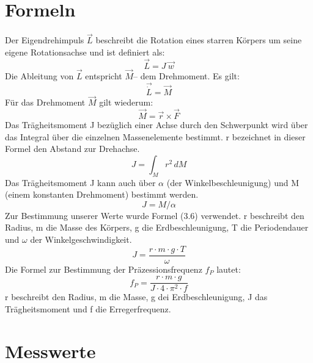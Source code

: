 \documentclass[12pt,a4paper,]{scrreprt}
\begin{document}
	\chapter{Formeln}
 Der Eigendrehimpuls $\vec L$  beschreibt die Rotation eines starren Körpers um seine eigene Rotationsachse und ist definiert als:\\
    \begin{equation}
\vec L = J~\vec w
\end{equation}
Die Ableitung von $\vec L$ entspricht $ \vec M $– dem Drehmoment. Es gilt:\\
\begin{equation}
\vec{\dot{L}} = \vec{M}
\end{equation}
Für das Drehmoment $\vec M$ gilt wiederum:
\begin{equation}
\vec M = \vec r \times \vec F
\end{equation}
Das Trägheitsmoment J bezüglich einer Achse durch den Schwerpunkt wird über das Integral über die einzelnen Massenelemente bestimmt. r bezeichnet in dieser Formel den Abstand zur Drehachse.\\
\begin{equation}
J=\int_M r^2 \,dM
\end{equation}
Das Trägheitsmoment J kann auch über $\alpha$ (der Winkelbeschleunigung) und M (einem konstanten Drehmoment) bestimmt werden.\\
\begin{equation}
J=M/\alpha
\end{equation}
Zur Bestimmung unserer Werte wurde Formel (3.6) verwendet. r beschreibt den Radius, m die Masse des Körpers, g die Erdbeschleunigung, T die Periodendauer und $\omega$ der Winkelgeschwindigkeit. 
\begin{equation}
	J  = \frac{r\cdot m \cdot g \cdot T}{\omega}
\end{equation}
Die Formel zur Bestimmung der Präzessionsfrequenz $f_P$ lautet:
\begin{equation}
	f_P = \frac{r\cdot m \cdot g}{J \cdot 4 \cdot \pi ^2 \cdot f}
\end{equation}
r beschreibt den Radius, m die Masse, g dei Erdbeschleunigung, J das Trägheitsmoment und f die Erregerfrequenz.
	\pagebreak

	\chapter{Messwerte}
    
\end{document}
